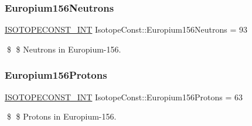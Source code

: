 \subsubsection{\texorpdfstring{Europium156\+Neutrons}{Europium156Neutrons}}
{\footnotesize\ttfamily \mbox{\hyperlink{group___isotope_const-_macros_ga5f18360b3e99483a35c32d789e62621c}{I\+S\+O\+T\+O\+P\+E\+C\+O\+N\+S\+T\+\_\+\+I\+NT}} Isotope\+Const\+::\+Europium156\+Neutrons = 93}

\$ \$ Neutrons in Europium-\/156. \mbox{\label{group___isotope_const-_europium-_eu156_ga9073d8b89b1c19b9315b3d05d7d68136}} 
\subsubsection{\texorpdfstring{Europium156\+Protons}{Europium156Protons}}
{\footnotesize\ttfamily \mbox{\hyperlink{group___isotope_const-_macros_ga5f18360b3e99483a35c32d789e62621c}{I\+S\+O\+T\+O\+P\+E\+C\+O\+N\+S\+T\+\_\+\+I\+NT}} Isotope\+Const\+::\+Europium156\+Protons = 63}

\$ \$ Protons in Europium-\/156. 